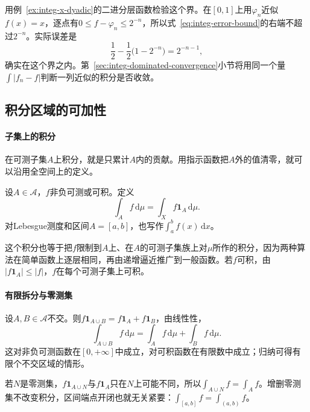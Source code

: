 用例~\ref{ex:integ-x-dyadic}的二进分层函数检验这个界。在$[0,1]$上用$\varphi_n$近似$f(x)=x$，逐点有$0\leq f-\varphi_n\leq2^{-n}$，所以式~\eqref{eq:integ-error-bound}的右端不超过$2^{-n}$。实际误差是
\[
 \frac12-\frac12\bigl(1-2^{-n}\bigr)=2^{-n-1},
\]
确实在这个界之内。第~\ref{sec:integ-dominated-convergence}小节将用同一个量$\int\lvert f_n-f\rvert$判断一列近似的积分是否收敛。

\subsection{积分区域的可加性}
\label{sec:integ-domain-additivity}

\paragraph{子集上的积分}
在可测子集$A$上积分，就是只累计$A$内的贡献。用指示函数把$A$外的值清零，就可以沿用全空间上的定义。

\begin{definition}[可测子集上的积分]
\label{def:integ-subset}
设$A\in\mathcal A$，$f$非负可测或可积。定义
\begin{equation}
 \int_Af\,\mathrm d\mu=\int_Xf\mathbf 1_A\,\mathrm d\mu .
 \label{eq:integ-subset}
\end{equation}
对Lebesgue测度和区间$A=[a,b]$，也写作$\int_a^bf(x)\,\mathrm dx$。
\end{definition}

这个积分也等于把$f$限制到$A$上、在$A$的可测子集族上对$\mu$所作的积分，因为两种算法在简单函数上逐层相同，再由递增逼近推广到一般函数。若$f$可积，由$\lvert f\mathbf 1_A\rvert\leq\lvert f\rvert$，$f$在每个可测子集上可积。

\paragraph{有限拆分与零测集}
设$A,B\in\mathcal A$不交。则$f\mathbf 1_{A\cup B}=f\mathbf 1_A+f\mathbf 1_B$，由线性性，
\begin{equation}
 \int_{A\cup B}f\,\mathrm d\mu=\int_Af\,\mathrm d\mu+\int_Bf\,\mathrm d\mu .
 \label{eq:integ-domain-additive}
\end{equation}
这对非负可测函数在$[0,+\infty]$中成立，对可积函数在有限数中成立；归纳可得有限个不交区域的情形。

若$N$是零测集，$f\mathbf 1_{A\cup N}$与$f\mathbf 1_A$只在$N$上可能不同，所以$\int_{A\cup N}f=\int_Af$。增删零测集不改变积分，区间端点开闭也就无关紧要：$\int_{[a,b]}f=\int_{(a,b)}f$。

